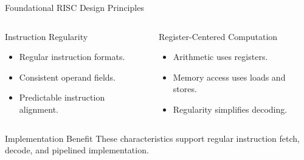 \documentclass[aspectratio=169,11pt,t]{beamer}
\begin{document}

\begin{frame}{Foundational RISC Design Principles}

\begin{columns}[T,onlytextwidth]


\begin{block}{Instruction Regularity}
\begin{itemize}
  \item Regular instruction formats.
  \item Consistent operand fields.
  \item Predictable instruction alignment.
\end{itemize}
\end{block}


\begin{block}{Register-Centered Computation}
\begin{itemize}
  \item Arithmetic uses registers.
  \item Memory access uses loads and stores.
  \item Regularity simplifies decoding.
\end{itemize}
\end{block}

\end{columns}

\vspace{0.15cm}

\begin{block}{Implementation Benefit}
These characteristics support regular
instruction fetch,
decode,
and pipelined implementation.
\end{block}

\end{frame}



\end{document}
